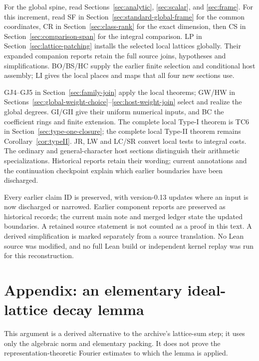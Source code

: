 \documentclass[11pt,a4paper]{article}
\numberwithin{equation}{section}
\theoremstyle{remark}\newtheorem{remark}[theorem]{Remark}
\begin{document}
For the global spine, read Sections~\ref{sec:analytic},
\ref{sec:scalar}, and \ref{sec:frame}. For this increment, read
SF in Section~\ref{sec:standard-global-frame} for the common coordinates,
CR in Section~\ref{sec:class-rank} for the exact dimension, then
CS in Section~\ref{sec:comparison-span} for the integral comparison.
LP in Section~\ref{sec:lattice-patching} installs the selected local
lattices globally. Their expanded companion reports retain the full
source joins, hypotheses and simplifications. BO/BS/HC supply the
earlier finite selection and conditional host assembly; LI gives the
local places and maps that all four new sections use.

GJ4--GJ5 in Section~\ref{sec:family-join} apply the local theorems;
GW/HW in Sections~\ref{sec:global-weight-choice}--\ref{sec:host-weight-join}
select and realize the global degrees. GI/GII give their uniform
numerical inputs, and BC the coefficient rings and finite extension.
The complete local Type-I theorem is TC6 in
Section~\ref{sec:type-one-closure}; the complete local Type-II theorem
remains Corollary~\ref{cor:typeII}. JR, LW and LC/SR convert local
tests to integral costs. The ordinary and general-character host
sections distinguish their arithmetic specializations. Historical
reports retain their wording; current annotations and the continuation
checkpoint explain which earlier boundaries have been discharged.

Every earlier claim ID is preserved, with version-0.13 updates where an input is now discharged or narrowed. Earlier component reports are preserved as historical records; the current main note and merged ledger state the updated boundaries. A retained source statement is not counted as a proof in this text. A derived simplification is marked separately from a source translation. No Lean source was modified, and no full Lean build or independent kernel replay was run for this reconstruction.

\section{Appendix: an elementary ideal-lattice decay lemma}
\label{app:ag-lattice}

This argument is a derived alternative to the archive's
lattice-sum step; it uses only the algebraic norm and elementary
packing.  It does not prove the representation-theoretic Fourier
estimates to which the lemma is applied.
\end{document}
